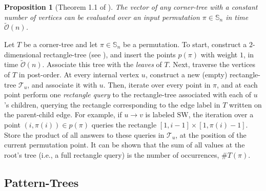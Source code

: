 \documentclass{article}
\newtheorem{proposition}[theorem]{Proposition}
\newcommand{\Sn}{\mathbb{S}_n}
\theoremstyle{remark}
\newenvironment{proofsketch}{\renewcommand{\proofname}{Proof Sketch}\proof}{\endproof}
\newcommand{\Otilde}[1]{\widetilde{\mathcal{O}}\left( #1 \right)}
\theoremstyle{plain}
\begin{document}
\begin{proposition} [Theorem 1.1 of \cite{even2021counting}]
    \label{prop:compute_corner_tree}
    The vector of any corner-tree with a constant number of vertices can be evaluated over an input permutation $\pi \in \Sn$ in time $\Otilde{n}$.
\end{proposition}
\begin{proofsketch}
    Let $T$ be a corner-tree and let $\pi \in \Sn$ be a permutation. To start, construct a $2$-dimensional rectangle-tree (see ), and insert the points $p(\pi)$ with weight $1$, in time $\Otilde{n}$. Associate this tree with the \textit{leaves} of $T$. Next, traverse the vertices of $T$ in post-order. At every internal vertex $u$, construct a new (empty) rectangle-tree $\mathcal{T}_u$, and associate it with $u$. Then, iterate over every point in $\pi$, and at each point perform one \textit{rectangle query} to the rectangle-tree associated with each of $u$'s children, querying the rectangle corresponding to the edge label in $T$ written on the parent-child edge. For example, if $u \to v$ is labeled $\text{SW}$, the iteration over a point $(i,\pi(i))\in p(\pi)$ queries the rectangle $[1,i-1]\times [1,\pi(i)-1]$. Store the product of all answers to these queries in $\mathcal{T}_u$, at the position of the current permutation point. It can be shown that the sum of all values at the root's tree (i.e., a full rectangle query) is the number of occurrences, $\#T(\pi)$.   
\end{proofsketch}

\subsection{Pattern-Trees}
\end{document}
